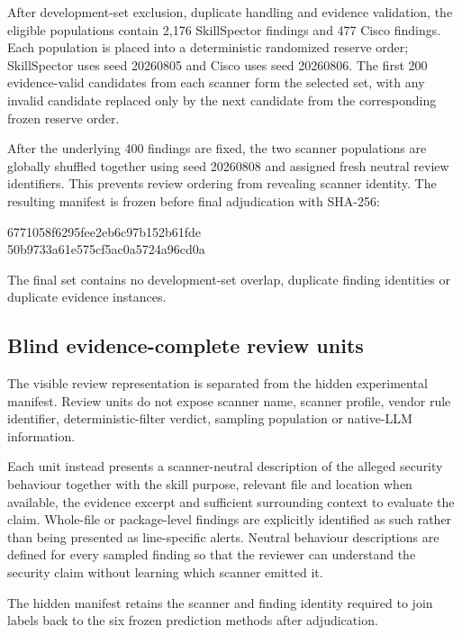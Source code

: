 \documentclass[conference]{IEEEtran}
\begin{document}
After development-set exclusion, duplicate handling and evidence validation, the eligible populations contain 2,176 SkillSpector findings and 477 Cisco findings. Each population is placed into a deterministic randomized reserve order; SkillSpector uses seed 20260805 and Cisco uses seed 20260806. The first 200 evidence-valid candidates from each scanner form the selected set, with any invalid candidate replaced only by the next candidate from the corresponding frozen reserve order.

After the underlying 400 findings are fixed, the two scanner populations are globally shuffled together using seed 20260808 and assigned fresh neutral review identifiers. This prevents review ordering from revealing scanner identity. The resulting manifest is frozen before final adjudication with SHA-256:

\begin{center}\ttfamily\footnotesize 6771058f6295fee2eb6c97b152b61fde\\ 50b9733a61e575cf5ac0a5724a96cd0a\end{center}

The final set contains no development-set overlap, duplicate finding identities or duplicate evidence instances.

\subsection{Blind evidence-complete review units}

The visible review representation is separated from the hidden experimental manifest. Review units do not expose scanner name, scanner profile, vendor rule identifier, deterministic-filter verdict, sampling population or native-LLM information.

Each unit instead presents a scanner-neutral description of the alleged security behaviour together with the skill purpose, relevant file and location when available, the evidence excerpt and sufficient surrounding context to evaluate the claim. Whole-file or package-level findings are explicitly identified as such rather than being presented as line-specific alerts. Neutral behaviour descriptions are defined for every sampled finding so that the reviewer can understand the security claim without learning which scanner emitted it.

The hidden manifest retains the scanner and finding identity required to join labels back to the six frozen prediction methods after adjudication.
\end{document}
